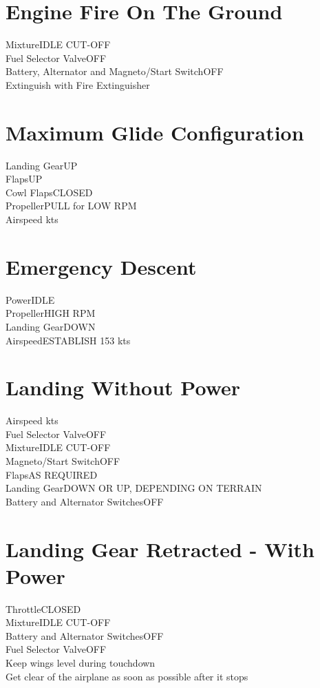 \documentclass{article}
\begin{document}
\begin{multicols*}{2}
\section*{Engine Fire On The Ground}
Mixture\dotfill IDLE CUT-OFF\\
Fuel Selector Valve\dotfill OFF\\
Battery, Alternator and Magneto/Start Switch\dotfill OFF\\
Extinguish with Fire Extinguisher
\section*{Maximum Glide Configuration}
Landing Gear\dotfill UP\\
Flaps\dotfill UP\\
Cowl Flaps\dotfill CLOSED\\
Propeller\dotfill PULL for LOW RPM\\
Airspeed kts
\section*{Emergency Descent}
Power\dotfill IDLE\\
Propeller\dotfill HIGH RPM\\
Landing Gear\dotfill DOWN\\
Airspeed\dotfill ESTABLISH 153 kts
\section*{Landing Without Power}
Airspeed kts\\
Fuel Selector Valve\dotfill OFF\\
Mixture\dotfill IDLE CUT-OFF\\
Magneto/Start Switch\dotfill OFF\\
Flaps\dotfill AS REQUIRED\\
Landing Gear\dotfill DOWN OR UP, DEPENDING ON TERRAIN\\
Battery and Alternator Switches\dotfill OFF
\section*{Landing Gear Retracted - With Power}
Throttle\dotfill CLOSED\\
Mixture\dotfill IDLE CUT-OFF\\
Battery and Alternator Switches\dotfill OFF\\
Fuel Selector Valve\dotfill OFF\\
Keep wings level during touchdown\\
Get clear of the airplane as soon as possible after it stops

\end{multicols*}
\end{document}
